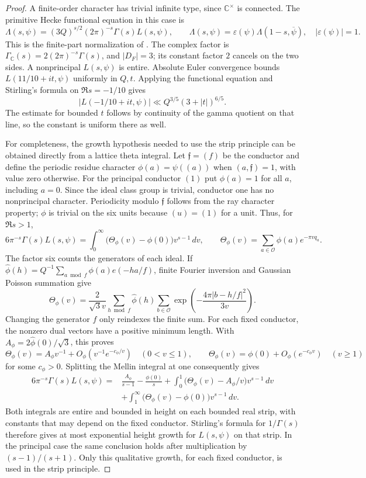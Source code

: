 \documentclass[12pt]{article}
\begin{document}
\begin{proof}
A finite-order character has trivial infinite type, since $\mathbb C^\times$
is connected.  The primitive Hecke functional equation in this case is
\[
 \Lambda(s,\psi)=(3Q)^{s/2}(2\pi)^{-s}\Gamma(s)L(s,\psi),\qquad
 \Lambda(s,\psi)=\varepsilon(\psi)\Lambda(1-s,\overline\psi),
 \quad |\varepsilon(\psi)|=1.
\]
This is the finite-part normalization of
\cite[Section 4.7 and Lemma 4.20, complex-place calculation; Section 5.11,
Theorem 5.22]{Poonen}.  The complex factor is
$\Gamma_{\mathbb C}(s)=2(2\pi)^{-s}\Gamma(s)$, and
$|D_F|=3$; its constant factor $2$ cancels on the two sides.
A nonprincipal $L(s,\psi)$ is entire.  Absolute Euler convergence bounds $L(11/10+it,\psi)$ uniformly in
$Q,t$.  Applying the functional equation and Stirling's formula on
$\Re s=-1/10$ gives
\[
 |L(-1/10+it,\psi)|\ll Q^{3/5}(3+|t|)^{6/5}.
\]
The estimate for bounded $t$ follows by continuity of the gamma quotient on
that line, so the constant is uniform there as well.

For completeness, the growth hypothesis needed to use the strip principle
can be obtained directly from a lattice theta integral.  Let
$\mathfrak f=(f)$ be the conductor and define the periodic residue character
$\phi(a)=\psi((a))$ when $(a,\mathfrak f)=1$, with value zero otherwise.
For the principal conductor $(1)$ put $\phi(a)=1$ for all $a$, including
$a=0$.  Since the ideal class group is trivial, conductor one has no
nonprincipal character.  Periodicity modulo $\mathfrak f$ follows from the ray character
property; $\phi$ is trivial on the six units because $(u)=(1)$ for a unit.
Thus, for $\Re s>1$,
\[
 6\pi^{-s}\Gamma(s)L(s,\psi)
 =\int_0^\infty\bigl(\Theta_\phi(v)-\phi(0)\bigr)v^{s-1}\,dv,
 \qquad
 \Theta_\phi(v)=\sum_{a\in\mathcal O}\phi(a)e^{-\pi vq_a}.
\]
The factor six counts the generators of each ideal.  If
$\widehat\phi(h)=Q^{-1}\sum_{a\bmod f}\phi(a)e(-ha/f)$,
finite Fourier inversion and Gaussian Poisson summation give
\[
 \Theta_\phi(v)=\frac{2}{\sqrt3v}
 \sum_{h\bmod f}\widehat\phi(h)
 \sum_{b\in\mathcal O}
    \exp\left(-\frac{4\pi|b-h/f|^2}{3v}\right).
\]
Changing the generator $f$ only reindexes the finite sum.  For each fixed
conductor, the nonzero dual vectors have a positive minimum length.  With
$A_\phi=2\widehat\phi(0)/\sqrt3$, this proves
\[
 \Theta_\phi(v)=A_\phi v^{-1}+O_\phi(v^{-1}e^{-c_\phi/v})\quad(0<v\le1),
 \qquad
 \Theta_\phi(v)=\phi(0)+O_\phi(e^{-c_\phi v})\quad(v\ge1)
\]
for some $c_\phi>0$.  Splitting the Mellin integral at one consequently gives
\[
 \begin{split}
 6\pi^{-s}\Gamma(s)L(s,\psi)
 ={}&\frac{A_\phi}{s-1}-\frac{\phi(0)}s
 +\int_0^1\bigl(\Theta_\phi(v)-A_\phi/v\bigr)v^{s-1}\,dv\\
 &+\int_1^\infty\bigl(\Theta_\phi(v)-\phi(0)\bigr)v^{s-1}\,dv.
 \end{split}
\]
Both integrals are entire and bounded in height on each bounded real strip,
with constants that may depend on the fixed conductor.  Stirling's formula
for $1/\Gamma(s)$ therefore gives at most exponential height growth for
$L(s,\psi)$ on that strip.  In the principal case the same conclusion holds
after multiplication by $(s-1)/(s+1)$.  Only this qualitative growth, for
each fixed conductor, is used in the strip principle.


\end{proof}
\end{document}
